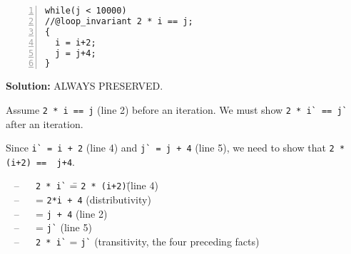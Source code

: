 \begin{lstlisting}[numbers=left]
while(j < 10000)
//@loop_invariant 2 * i == j;
{
  i = i+2;
  j = j+4;
}
\end{lstlisting}
\begin{framed}\textbf{Solution:}
ALWAYS PRESERVED.





Assume \lstinline'2 * i == j' (line 2) before an iteration.
We must show \lstinline'2 * i` == j`' after an iteration.

Since \lstinline'i` = i + 2' (line 4)
and \lstinline'j` = j + 4' (line 5), we need to show that
\lstinline'2 * (i+2) ==  j+4'.

\begin{tabbing}
~ -- ~~ \lstinline'2 * i`' \== \lstinline'2 * (i+2)'\qquad\= (line 4)\\
~ -- ~~ \phantom{\lstinline'2 * (i+2)'}\> = \lstinline'2*i + 4'        \> (distributivity)\\
~ -- ~~ \phantom{\lstinline'2*i + 4'}  \> = \lstinline'j + 4'          \> (line 2)\\
~ -- ~~ \phantom{\lstinline'j + 4'}    \> = \lstinline'j`'             \> (line 5)\\
~ -- ~~ \lstinline'2 * i`'   \> = \lstinline'j`'             \> (transitivity, the four preceding facts)
\end{tabbing}

\end{framed}
